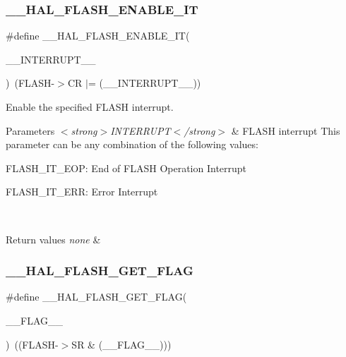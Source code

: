\subsubsection{\texorpdfstring{\_\_HAL\_FLASH\_ENABLE\_IT}{\_\_HAL\_FLASH\_ENABLE\_IT}}
{\footnotesize\ttfamily \#define \+\_\+\+\_\+\+H\+A\+L\+\_\+\+F\+L\+A\+S\+H\+\_\+\+E\+N\+A\+B\+L\+E\+\_\+\+IT(\begin{DoxyParamCaption}\item[{}]{\+\_\+\+\_\+\+I\+N\+T\+E\+R\+R\+U\+P\+T\+\_\+\+\_\+ }\end{DoxyParamCaption})~(F\+L\+A\+SH-\/$>$CR $\vert$= (\+\_\+\+\_\+\+I\+N\+T\+E\+R\+R\+U\+P\+T\+\_\+\+\_\+))}



Enable the specified F\+L\+A\+SH interrupt. 


\begin{DoxyParams}{Parameters}
{\em $<$strong$>$\+I\+N\+T\+E\+R\+R\+U\+P\+T$<$/strong$>$} & F\+L\+A\+SH interrupt This parameter can be any combination of the following values\+: \begin{DoxyItemize}
\item F\+L\+A\+S\+H\+\_\+\+I\+T\+\_\+\+E\+OP\+: End of F\+L\+A\+SH Operation Interrupt \item F\+L\+A\+S\+H\+\_\+\+I\+T\+\_\+\+E\+RR\+: Error Interrupt \end{DoxyItemize}
\\
\hline
\end{DoxyParams}

\begin{DoxyRetVals}{Return values}
{\em none} & \\
\hline
\end{DoxyRetVals}
\mbox{\label{group___f_l_a_s_h___exported___macros_ga0d3dd161fecc0e47c9e109c7c28672c1}} 
\subsubsection{\texorpdfstring{\_\_HAL\_FLASH\_GET\_FLAG}{\_\_HAL\_FLASH\_GET\_FLAG}}
{\footnotesize\ttfamily \#define \+\_\+\+\_\+\+H\+A\+L\+\_\+\+F\+L\+A\+S\+H\+\_\+\+G\+E\+T\+\_\+\+F\+L\+AG(\begin{DoxyParamCaption}\item[{}]{\+\_\+\+\_\+\+F\+L\+A\+G\+\_\+\+\_\+ }\end{DoxyParamCaption})~((F\+L\+A\+SH-\/$>$SR \& (\+\_\+\+\_\+\+F\+L\+A\+G\+\_\+\+\_\+)))}



